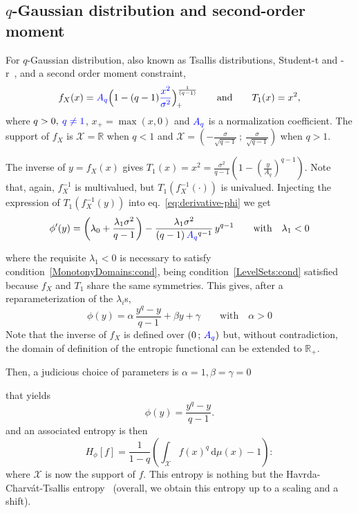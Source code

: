 \documentclass[entropy,article,submit,moreauthors,pdftex]{Definitions/mdpi}
\newcommand{\SZ}[1]{{\color{blue} #1}}                                       %
\def\dmu{\mathrm{d}\mu}%
\def\Rset{\mathbb{R}}%
\def\X{\mathcal{X}}%
\begin{document}

\subsection{$q$-Gaussian distribution and second-order moment}
\label{subsecapp:qNormalSecondOrder}

For $q$-Gaussian distribution, also known  as Tsallis distributions, Student-t and
-r~\cite{CosHer03, JohKot95:v2}, and a second order moment constraint,
%
\[
f_X(x)     =    \SZ{A_q}     \Big(     1     -    (q-1)     \SZ{\frac{x^2}{\sigma^2}}
\Big)_{\!+}^{\frac{1}{(q-1)}} \qquad \mbox{and} \qquad T_1(x) = x^2,
\]
%
where $q > 0,  \: \SZ{q \ne 1}$, $x_+ = \max(x,0)$ and  $\SZ{A_q}$ is a normalization
coefficient.   \SZ{The support  of  $f_X$ is  $\X  =  \Rset$ when  $q  < 1$  and
  $\displaystyle   \X   =   \left(   -   \frac{\sigma}{\sqrt{q-1}}   \:   ;   \:
  \frac{\sigma}{\sqrt{q-1}} \right)$ when $q > 1$.}

\SZ{The  inverse of  $y =  f_X(x)$ gives  $T_1(x) =  x^2 =  \frac{\sigma^2}{q-1}
  \left( 1  - \left(  \frac{y}{A_q} \right)^{q-1}  \right)$.  Note  that, again,
  $f_X^{-1}$  is  multivalued, but  $T_1\left(  f_X^{-1}(  \cdot )  \right)$  is
  univalued.  Injecting  the expression of $T_1\left(  f_X^{-1}(y) \right)$ into
  eq.~\eqref{eq:derivative-phi} we get}
%
\[
\phi'(y)  =   \left(  \lambda_0  +  \frac{\lambda_1   \sigma^2}{q-1}  \right)  -
\frac{\lambda_1  \sigma^2}{(q-1) \, \SZ{A_q}^{q-1}}  \, y^{q-1}  \qquad  \mbox{with}  \quad
\lambda_1 < 0
\]
%
\SZ{where   the    requisite   $\lambda_1    <0$   is   necessary    to   satisfy
  condition~\ref{MonotonyDomains:cond},   being   condition~\ref{LevelSets:cond}
  satisfied because $f_X$ and $T_1$ share the same symmetries. This gives, after
  a reparameterization of the $\lambda_i$s,
  \[
  \phi(y) = \alpha \,  \frac{y^q - y}{q-1} + \beta y  + \gamma \qquad \mbox{with}
  \quad \alpha > 0
  \]
  Note that the inverse of $f_X$ is defined  over $\left( 0 \, ; \, \SZ{A_q} \right)$
  but,  without  contradiction,  the  domain   of  definition  of  the  entropic
  functional can be extended to $\Rset_+$.
  
Then, a judicious choice of parameters is $\alpha = 1, \beta = \gamma = 0$} that
yields
%
\[
\phi(y) = \frac{y^q-y}{q-1}.
\]
%
and an associated entropy is then 
%
\[
H_\phi[f] = \frac{1}{1-q} \left( \int_\X f(x)^q \, \dmu(x) - 1 \right):
\]
\SZ{where $\X$ is now the support of $f$.}
%
\SZ{This    entropy}    is    nothing    but    the    Havrda-Charv\'at-Tsallis
entropy~\cite{HavCha67,  Dar70, Tsa88,  CosHer03} \SZ{(overall,  we obtain  this
  entropy up to a scaling and a shift).}
\end{document}
